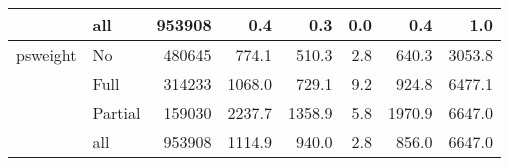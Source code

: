 \documentclass[11pt, oneside]{article}        %
\begin{document}
\begin{table}[ht]
{\begin{tabular}{llrrrrrr}
   \hline
 & all & 953908 &    0.4 &    0.3 & 0.0 &    0.4 &    1.0 \\ 
   \hline
psweight & No & 480645 &  774.1 &  510.3 & 2.8 &  640.3 & 3053.8 \\ 
   & Full & 314233 & 1068.0 &  729.1 & 9.2 &  924.8 & 6477.1 \\ 
   & Partial & 159030 & 2237.7 & 1358.9 & 5.8 & 1970.9 & 6647.0 \\ 
   \hline
 & all & 953908 & 1114.9 &  940.0 & 2.8 &  856.0 & 6647.0 \\ 
   \hline
\end{tabular}
}

\label{tab:descriptive.2}
\end{table}

\end{document}
